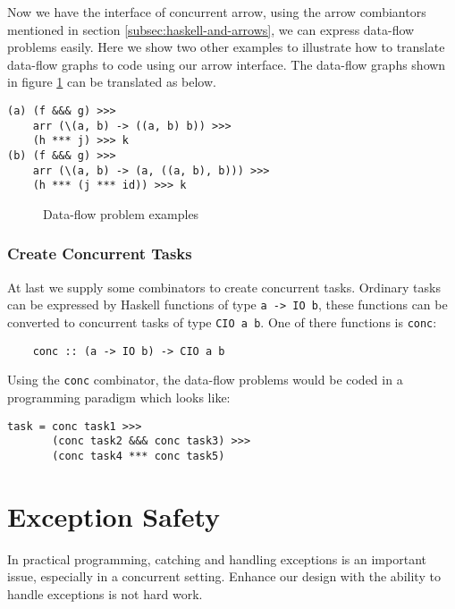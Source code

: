 \documentclass[conference]{IEEEtran}
\begin{document}
Now we have the interface of concurrent arrow, using the arrow combiantors mentioned in section
\ref{subsec:haskell-and-arrows}, we can express data-flow problems easily. Here we show two other
examples to illustrate how to translate data-flow graphs to code using our arrow interface. The data-flow
graphs shown in figure \ref{fig:examples} can be translated as below.
\begin{verbatim}
(a) (f &&& g) >>>
    arr (\(a, b) -> ((a, b) b)) >>>
    (h *** j) >>> k
(b) (f &&& g) >>>
    arr (\(a, b) -> (a, ((a, b), b))) >>>
    (h *** (j *** id)) >>> k
\end{verbatim}
\begin{figure}
  \centerline{
    \hfil
  }
  \caption{Data-flow problem examples}
  \label{fig:examples}
\end{figure}

\subsubsection{Create Concurrent Tasks}
At last we supply some combinators to create concurrent tasks. Ordinary tasks can be
expressed by Haskell functions of type \texttt{a -> IO b}, these functions can be
converted to concurrent tasks of type \texttt{CIO a b}. One of there functions is \texttt{conc}:
\begin{verbatim}
    conc :: (a -> IO b) -> CIO a b
\end{verbatim}
Using the \texttt{conc} combinator, the data-flow problems would be coded in a programming
paradigm which looks like:
\begin{verbatim}
task = conc task1 >>>
       (conc task2 &&& conc task3) >>>
       (conc task4 *** conc task5)
\end{verbatim}

\section{Exception Safety}\label{sec:exception-safety}
In practical programming, catching and handling exceptions is an important issue, especially
in a concurrent setting.\cite{Marlow2001} Enhance our design with the ability to handle exceptions is not hard
work.
\end{document}
